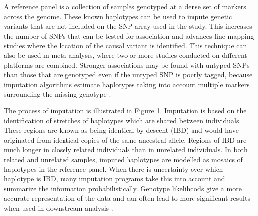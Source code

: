 \documentclass[a4paper,11pt,twoside,abstraction,titlepage]{article}
\begin{document}
A reference panel is a collection of samples genotyped at a dense set of markers across the genome.  These known haplotypes can be used to impute genetic variants that are not included on the SNP array used in the study.  This increases the number of SNPs that can be tested for association and advances fine-mapping studies where the location of the causal variant is identified. This technique can also be used in meta-analysis, where two or more studies conducted on different platforms are combined.  Stronger associations may be found with untyped SNPs than those that are genotyped even if the untyped SNP is poorly tagged, because imputation algorithms estimate haplotypes taking into account multiple markers surrounding the missing genotype \cite{review2010}.

The process of imputation is illustrated in Figure 1. Imputation is based on the identification of stretches of haplotypes which are shared between individuals.  These regions are known as being identical-by-descent (IBD) and would have originated from identical copies of the same ancestral allele.  Regions of IBD are much longer in closely related individuals than in unrelated individuals. In both related and unrelated samples, imputed haplotypes are modelled as mosaics of haplotypes in the reference panel.  When there is uncertainty over which haplotype is IBD, many imputation programs take this into account and summarize the information probabilistically.  Genotype likelihoods give a more accurate representation of the data and can often lead to more significant results when used in downstream analysis \cite{review2010}.
\end{document}
